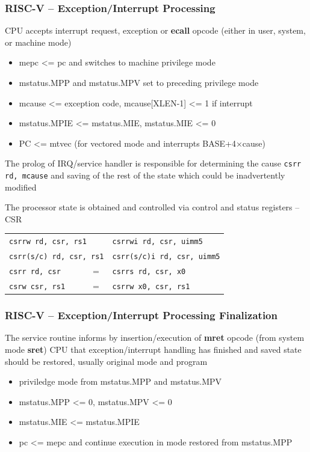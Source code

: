 \documentclass{beamer}
\begin{document}
\begin{frame}
\frametitle{RISC-V -- Exception/Interrupt Processing}

CPU accepts interrupt request, exception or \textbf{ecall} opcode (either in user, system, or machine mode)

\begin{itemize}
 \item mepc <= pc and switches to machine privilege mode
 \item mstatus.MPP and mstatus.MPV set to preceding privilege mode
 \item mcause <= exception code, mcause[XLEN-1] <= 1 if interrupt
 \item mstatus.MPIE <= mstatus.MIE, mstatus.MIE <= 0
 \item PC <= mtvec (for vectored mode and interrupts BASE+4×cause)
\end{itemize}

The prolog of IRQ/service handler is responsible for determining
the cause \texttt{csrr rd, mcause} and saving of the rest of
the state which could be inadvertently modified

The processor state is obtained and controlled via control and status registers -- CSR

\begin{tabular}{l c l}
\multicolumn{2}{l}{\texttt{csrrw rd, csr, rs1}} & \texttt{csrrwi rd, csr, uimm5} \\
\multicolumn{2}{l}{\texttt{csrr(s/c) rd, csr, rs1}}  & \texttt{csrr(s/c)i rd, csr, uimm5} \\
\texttt{csrr rd, csr} &  $=$ & \texttt{csrrs rd, csr, x0} \\
\texttt{csrw csr, rs1} & $=$ & \texttt{csrrw x0, csr, rs1} \\
\end{tabular}
\end{frame}

\begin{frame}
\frametitle{RISC-V -- Exception/Interrupt Processing Finalization}

The service routine informs by insertion/execution of \textbf{mret} opcode (from system mode \textbf{sret})
CPU that exception/interrupt handling has finished and saved state should be restored, usually original
mode and program

\begin{itemize}
 \item priviledge mode from mstatus.MPP and mstatus.MPV\footnotemark[1]
 \item mstatus.MPP <= 0, mstatus.MPV <= 0\footnotemark[1]
 \item mstatus.MIE <= mstatus.MPIE
 \item pc <= mepc and continue execution in mode restored from mstatus.MPP
\end{itemize}
\end{frame}
\end{document}
